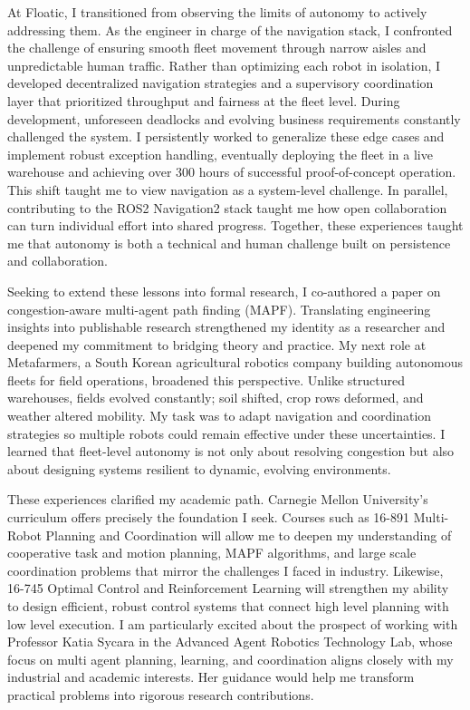 \documentclass[12pt]{article}
\begin{document}
\vspace{0.5em}
At Floatic, I transitioned from observing the limits of autonomy to actively addressing them. As the engineer in charge of the navigation stack, I confronted the challenge of ensuring smooth fleet movement through narrow aisles and unpredictable human traffic. Rather than optimizing each robot in isolation, I developed decentralized navigation strategies and a supervisory coordination layer that prioritized throughput and fairness at the fleet level. During development, unforeseen deadlocks and evolving business requirements constantly challenged the system. I persistently worked to generalize these edge cases and implement robust exception handling, eventually deploying the fleet in a live warehouse and achieving over 300 hours of successful proof-of-concept operation. This shift taught me to view navigation as a system-level challenge. In parallel, contributing to the ROS2 Navigation2 stack taught me how open collaboration can turn individual effort into shared progress. Together, these experiences taught me that autonomy is both a technical and human challenge built on persistence and collaboration.

\vspace{0.5em}
Seeking to extend these lessons into formal research, I co-authored a paper on congestion-aware multi-agent path finding (MAPF). Translating engineering insights into publishable research strengthened my identity as a researcher and deepened my commitment to bridging theory and practice. My next role at Metafarmers, a South Korean agricultural robotics company building autonomous fleets for field operations, broadened this perspective. Unlike structured warehouses, fields evolved constantly; soil shifted, crop rows deformed, and weather altered mobility. My task was to adapt navigation and coordination strategies so multiple robots could remain effective under these uncertainties. I learned that fleet-level autonomy is not only about resolving congestion but also about designing systems resilient to dynamic, evolving environments.

\vspace{0.5em}
These experiences clarified my academic path. Carnegie Mellon University’s curriculum offers precisely the foundation I seek. Courses such as 16-891 Multi-Robot Planning and Coordination will allow me to deepen my understanding of cooperative task and motion planning, MAPF algorithms, and large scale coordination problems that mirror the challenges I faced in industry. Likewise, 16-745 Optimal Control and Reinforcement Learning will strengthen my ability to design efficient, robust control systems that connect high level planning with low level execution. I am particularly excited about the prospect of working with Professor Katia Sycara in the Advanced Agent Robotics Technology Lab, whose focus on multi agent planning, learning, and coordination aligns closely with my industrial and academic interests. Her guidance would help me transform practical problems into rigorous research contributions.
\end{document}
